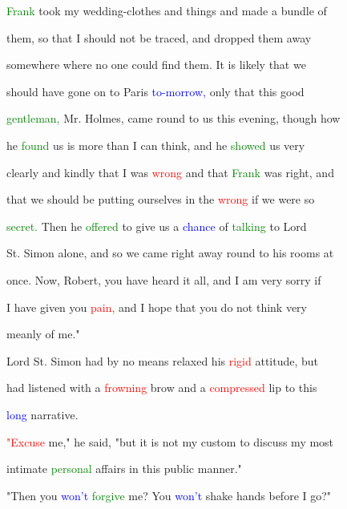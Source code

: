  \textcolor{green}{Frank} took my wedding-clothes and things and made a bundle of

 them, so that I should not be traced, and dropped them away

 somewhere where no one could find them. It is likely that we

 should have gone on to Paris \textcolor{blue}{to-morrow,} only that this \textcolor{BurntOrange}{good}

 \textcolor{green}{gentleman,} Mr. Holmes, came round to us this evening, though how

 he \textcolor{green}{found} us is more than I can think, and he \textcolor{green}{showed} us very

 clearly and kindly that I was \textcolor{red}{wrong} and that \textcolor{green}{Frank} was right, and

 that we should be putting ourselves in the \textcolor{red}{wrong} if we were so

 \textcolor{green}{secret.} Then he \textcolor{green}{offered} to give us a \textcolor{blue}{chance} of \textcolor{green}{talking} to \textcolor{BurntOrange}{Lord}

 St. Simon alone, and so we came right away round to his rooms at

 once. Now, Robert, you have heard it all, and I am very sorry if

 I have given you \textcolor{red}{pain,} and I \textcolor{BurntOrange}{hope} that you do not think very

 meanly of me."



 \textcolor{BurntOrange}{Lord} St. Simon had by no means relaxed his \textcolor{red}{rigid} attitude, but

 had listened with a \textcolor{red}{frowning} brow and a \textcolor{red}{compressed} lip to this

 \textcolor{blue}{long} narrative.



 \textcolor{red}{"Excuse} me," he said, "but it is not my custom to discuss my most

 \textcolor{BurntOrange}{intimate} \textcolor{green}{personal} affairs in this \textcolor{BurntOrange}{public} manner."



 "Then you \textcolor{blue}{won't} \textcolor{green}{forgive} me? You \textcolor{blue}{won't} shake hands before I go?"



